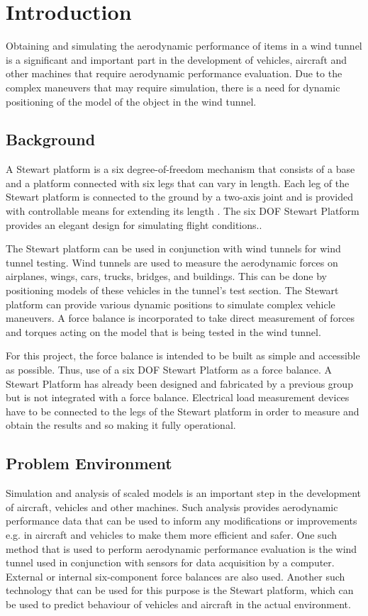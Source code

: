 \section{Introduction}
\label{sec:introduction}
Obtaining and simulating the aerodynamic performance of items in a wind tunnel is a
significant and important part in the development of vehicles, aircraft and other machines
that require aerodynamic performance evaluation. Due to the complex maneuvers that
may require simulation, there is a need for dynamic positioning of the model of the object
in the wind tunnel.
\subsection{Background}
A Stewart platform is a six degree-of-freedom mechanism that consists of a base and a platform connected with six legs that can vary in length. Each leg of the Stewart platform is connected to the ground by a two-axis joint and is provided with controllable means for extending its length
\cite{wittenburg2016stewart}. The six DOF Stewart Platform provides an elegant design for simulating flight conditions.\cite{stewart1965platform}. 

The Stewart platform can be used in conjunction with wind tunnels for wind tunnel testing. Wind tunnels are used to measure the aerodynamic forces on airplanes, wings, cars, trucks, bridges, and buildings. This can be done by positioning models of these vehicles in the tunnel's test section. The Stewart platform can provide various dynamic positions to simulate complex vehicle maneuvers. A force balance is incorporated to take direct measurement of forces and torques acting on the model that is being tested in the wind tunnel.

For this project, the force balance is intended to be built as simple and accessible as possible. Thus, use of a six DOF Stewart Platform as a force balance. A Stewart Platform has already been designed and fabricated by a previous group but is not integrated with a force balance. Electrical load measurement devices have to be connected to the legs of the Stewart platform in order to measure and obtain the results and so making it fully operational.

\subsection{Problem Environment}
Simulation and analysis of scaled models is an important step in the development of aircraft, vehicles and other machines. Such analysis provides aerodynamic performance data that can be used to inform any modifications or improvements e.g. in aircraft and vehicles to make them more efficient and safer. One such method that is used to perform aerodynamic performance evaluation is the wind tunnel used in conjunction with sensors for data acquisition by a computer. External or internal six-component force balances are also used. Another such technology that can be used for this purpose is the Stewart platform, which can be used to predict behaviour of vehicles and aircraft in the actual environment.

